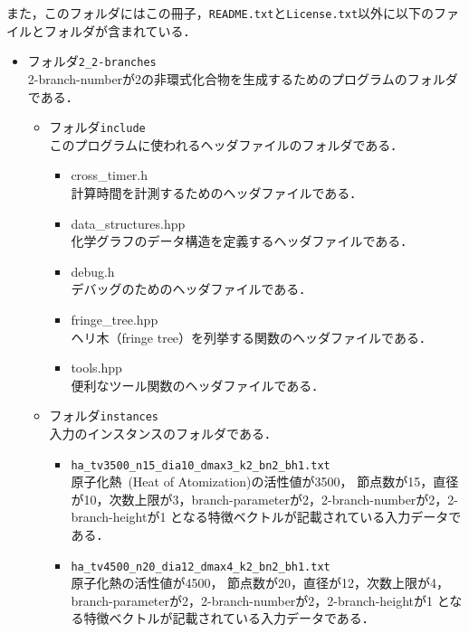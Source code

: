 \documentclass[11pt,titlepage,dvipdfmx,twoside]{jarticle}
\begin{document}
また，このフォルダにはこの冊子，{\tt README.txt}と{\tt License.txt}以外に以下のファイルとフォルダが含まれている．
\begin{itemize}
\item フォルダ{\tt 2\_2-branches}\\
	2-branch-numberが2の非環式化合物を生成するためのプログラムのフォルダである．
	\begin{itemize}
	\item フォルダ{\tt include}\\
		このプログラムに使われるヘッダファイルのフォルダである．
		\begin{itemize}
			\item{cross\_timer.h}\\
				計算時間を計測するためのヘッダファイルである．
				
			\item{data\_structures.hpp}\\
				化学グラフのデータ構造を定義するヘッダファイルである． 
				
			\item{debug.h}\\
				デバッグのためのヘッダファイルである．
				
			\item{fringe\_tree.hpp}\\
				ヘリ木（fringe tree）\cite{branch}を列挙する関数のヘッダファイルである．
				
			\item{tools.hpp}\\
				便利なツール関数のヘッダファイルである．		
		\end{itemize}
	\item フォルダ{\tt instances}\\
		入力のインスタンスのフォルダである．
		\begin{itemize}
			\item{\tt ha\_tv3500\_n15\_dia10\_dmax3\_k2\_bn2\_bh1.txt}\\
				原子化熱~(Heat of Atomization)の活性値が3500，
				節点数が15，直径が10，次数上限が3，branch-parameterが2，2-branch-numberが2，2-branch-heightが1
				となる特徴ベクトルが記載されている入力データである．
				
			\item{\tt ha\_tv4500\_n20\_dia12\_dmax4\_k2\_bn2\_bh1.txt}\\
				原子化熱の活性値が4500，
				節点数が20，直径が12，次数上限が4，branch-parameterが2，2-branch-numberが2，2-branch-heightが1
				となる特徴ベクトルが記載されている入力データである．
				

\end{itemize}
\end{itemize}
\end{itemize}
\end{document}
